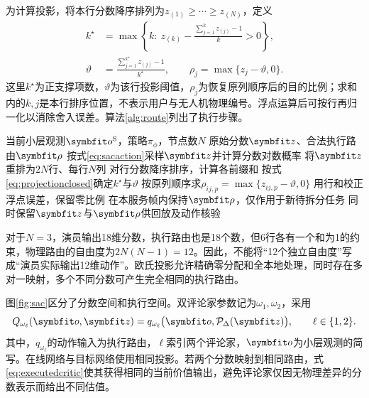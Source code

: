 为计算投影，将本行分数降序排列为$z_{(1)}\ge\cdots\ge z_{(N)}$，定义
\begin{equation}
 \begin{aligned}
 k^\star&=\max\left\{k:\
 z_{(k)}-\frac{\sum_{j=1}^{k}z_{(j)}-1}{k}>0\right\},\\
 \vartheta&=\frac{\sum_{j=1}^{k^\star}z_{(j)}-1}{k^\star},\qquad
 \rho_j=\max\{z_j-\vartheta,0\}.
 \end{aligned}
 \label{eq:projectionclosed}
\end{equation}
这里$k^\star$为正支撑项数，$\vartheta$为该行投影阈值，$\rho_j$为恢复原列顺序后的目的比例；求和内的$k,j$是本行排序位置，不表示用户与无人机物理编号。浮点运算后可按行再归一化以消除舍入误差。算法\ref{alg:route}列出了执行步骤。

\begin{algorithm}[t]
\caption{Direct SAC路由动作解码}
\label{alg:route}
\small
\begin{algorithmic}[1]
\Require 当前小层观测$\vct o^{\mathrm S}$，策略$\pi_\phi$，节点数$N$
\Ensure 原始分数$\vct z$、合法执行路由$\vct\rho$
\State 按式\eqref{eq:sacaction}采样$\vct z$并计算分数对数概率
\State 将$\vct z$重排为$2N$行、每行$N$列
  \State 对行分数降序排序，计算各前缀和
  \State 按式\eqref{eq:projectionclosed}确定$k^\star$与$\vartheta$
  \State 按原列顺序求$\rho_{ij,p}=\max\{z_{ij,p}-\vartheta,0\}$
  \State 用行和校正浮点误差，保留零比例
\EndFor
\State 在本服务帧内保持$\vct\rho$，仅作用于新待拆分任务
\State 同时保留$\vct z$与$\vct\rho$供回放及动作核验
\end{algorithmic}
\end{algorithm}

对于$N=3$，演员输出18维分数，执行路由也是18个数，但6行各有一个和为1的约束，物理路由的自由度为$2N(N-1)=12$。因此，不能将“12个独立自由度”写成“演员实际输出12维动作”。欧氏投影允许精确零分配和全本地处理，同时存在多对一映射，多个不同分数可产生完全相同的执行路由。

图\ref{fig:sac}区分了分数空间和执行空间。双评论家参数记为$\omega_1,\omega_2$，采用
\begin{equation}
 Q_{\omega_\ell}(\vct o,\vct z)
 =q_{\omega_\ell}\big(\vct o,\mathcal P_\Delta(\vct z)\big),
 \qquad \ell\in\{1,2\}.
 \label{eq:executedcritic}
\end{equation}
其中，$q_{\omega_\ell}$的动作输入为执行路由，$\ell$索引两个评论家，$\vct o$为小层观测的简写。在线网络与目标网络使用相同投影。若两个分数映射到相同路由，式\eqref{eq:executedcritic}使其获得相同的当前价值输出，避免评论家仅因无物理差异的分数表示而给出不同估值。

